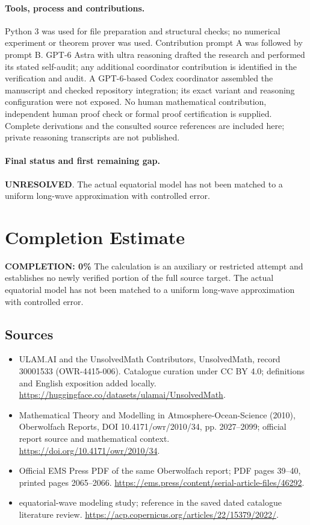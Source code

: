 \documentclass[11pt]{article}
\begin{document}
\paragraph{Tools, process and contributions.}
Python 3 was used for file preparation and structural checks; no numerical experiment or theorem prover was used. Contribution prompt A was followed by prompt B. GPT-6 Astra with ultra reasoning drafted the research and performed its stated self-audit; any additional coordinator contribution is identified in the verification and audit. A GPT-6-based Codex coordinator assembled the manuscript and checked repository integration; its exact variant and reasoning configuration were not exposed. No human mathematical contribution, independent human proof check or formal proof certification is supplied. Complete derivations and the consulted source references are included here; private reasoning transcripts are not published.

\paragraph{Final status and first remaining gap.}
\textbf{UNRESOLVED}. The actual equatorial model has not been matched to a uniform long-wave approximation with controlled error.

\section{Completion Estimate}
\noindent\textbf{COMPLETION: 0\%}
The calculation is an auxiliary or restricted attempt and establishes no newly verified portion of the full source target. The actual equatorial model has not been matched to a uniform long-wave approximation with controlled error.

\subsection{Sources}
\begin{itemize}
\item[\hypertarget{source:30001533:1}{S1}] ULAM.AI and the UnsolvedMath Contributors, UnsolvedMath, record 30001533 (OWR-4415-006). Catalogue curation under CC BY 4.0; definitions and English exposition added locally.
\url{https://huggingface.co/datasets/ulamai/UnsolvedMath}.
\item[\hypertarget{source:30001533:2}{S2}] Mathematical Theory and Modelling in Atmosphere-Ocean-Science (2010), Oberwolfach Reports, DOI 10.4171/owr/2010/34, pp. 2027--2099; official report source and mathematical context.
\url{https://doi.org/10.4171/owr/2010/34}.
\item[\hypertarget{source:30001533:3}{S3}] Official EMS Press PDF of the same Oberwolfach report; PDF pages 39--40, printed pages 2065--2066.
\url{https://ems.press/content/serial-article-files/46292}.
\item[\hypertarget{source:30001533:4}{S4}] equatorial-wave modeling study; reference in the saved dated catalogue literature review.
\url{https://acp.copernicus.org/articles/22/15379/2022/}.
\end{itemize}
\label{end:30001533}
\end{document}

